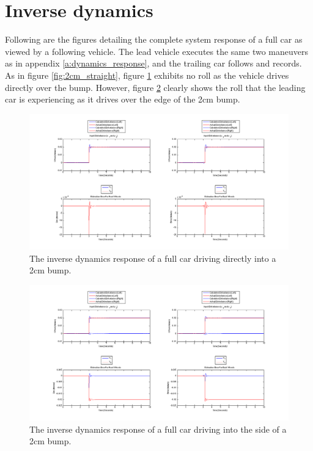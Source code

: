\section{Inverse dynamics}
Following are the figures detailing the complete system response of a full car as viewed by a following vehicle. The lead vehicle executes the same two maneuvers as in appendix \ref{a:dynamics_response}, and the trailing car follows and records. As in figure \ref{fig:2cm_straight}, figure \ref{fig:2cm_straight_inv} exhibits no roll as the vehicle drives directly over the bump. However, figure \ref{fig:2cm_ramp_inv} clearly shows the roll that the leading car is experiencing as it drives over the edge of the 2cm bump.

\begin{figure}[t]
	\centering
	\includegraphics[width=1\textwidth]{figures/fullcar_2cm_straight_inverse.png}
	\caption{The inverse dynamics response of a full car driving directly into a 2cm bump.}
	\label{fig:2cm_straight_inv}
\end{figure}

\begin{figure}[t]
	\centering
	\includegraphics[width=1\textwidth]{figures/fullcar_2cm_ramp_inverse.png}
	\caption{The inverse dynamics response of a full car driving into the side of a 2cm bump.}
	\label{fig:2cm_ramp_inv}
\end{figure}


